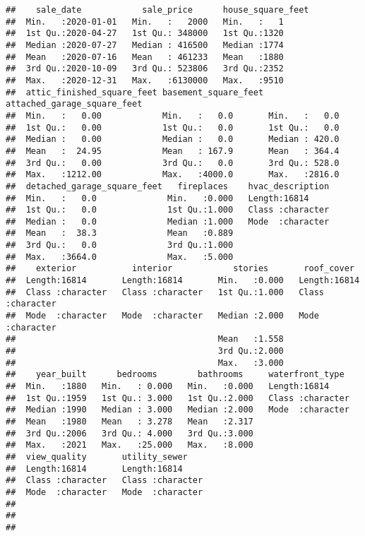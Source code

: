 \documentclass[
]{article}
\begin{document}
\begin{verbatim}
##    sale_date            sale_price      house_square_feet
##  Min.   :2020-01-01   Min.   :   2000   Min.   :   1     
##  1st Qu.:2020-04-27   1st Qu.: 348000   1st Qu.:1320     
##  Median :2020-07-27   Median : 416500   Median :1774     
##  Mean   :2020-07-16   Mean   : 461233   Mean   :1880     
##  3rd Qu.:2020-10-09   3rd Qu.: 523806   3rd Qu.:2352     
##  Max.   :2020-12-31   Max.   :6130000   Max.   :9510     
##  attic_finished_square_feet basement_square_feet attached_garage_square_feet
##  Min.   :   0.00            Min.   :   0.0       Min.   :   0.0             
##  1st Qu.:   0.00            1st Qu.:   0.0       1st Qu.:   0.0             
##  Median :   0.00            Median :   0.0       Median : 420.0             
##  Mean   :  24.95            Mean   : 167.9       Mean   : 364.4             
##  3rd Qu.:   0.00            3rd Qu.:   0.0       3rd Qu.: 528.0             
##  Max.   :1212.00            Max.   :4000.0       Max.   :2816.0             
##  detached_garage_square_feet   fireplaces    hvac_description  
##  Min.   :   0.0              Min.   :0.000   Length:16814      
##  1st Qu.:   0.0              1st Qu.:1.000   Class :character  
##  Median :   0.0              Median :1.000   Mode  :character  
##  Mean   :  38.3              Mean   :0.889                     
##  3rd Qu.:   0.0              3rd Qu.:1.000                     
##  Max.   :3664.0              Max.   :5.000                     
##    exterior           interior            stories       roof_cover       
##  Length:16814       Length:16814       Min.   :0.000   Length:16814      
##  Class :character   Class :character   1st Qu.:1.000   Class :character  
##  Mode  :character   Mode  :character   Median :2.000   Mode  :character  
##                                        Mean   :1.558                     
##                                        3rd Qu.:2.000                     
##                                        Max.   :3.000                     
##    year_built      bedrooms        bathrooms     waterfront_type   
##  Min.   :1880   Min.   : 0.000   Min.   :0.000   Length:16814      
##  1st Qu.:1959   1st Qu.: 3.000   1st Qu.:2.000   Class :character  
##  Median :1990   Median : 3.000   Median :2.000   Mode  :character  
##  Mean   :1980   Mean   : 3.278   Mean   :2.317                     
##  3rd Qu.:2006   3rd Qu.: 4.000   3rd Qu.:3.000                     
##  Max.   :2021   Max.   :25.000   Max.   :8.000                     
##  view_quality       utility_sewer     
##  Length:16814       Length:16814      
##  Class :character   Class :character  
##  Mode  :character   Mode  :character  
##                                       
##                                       
## 
\end{verbatim}
\end{document}
